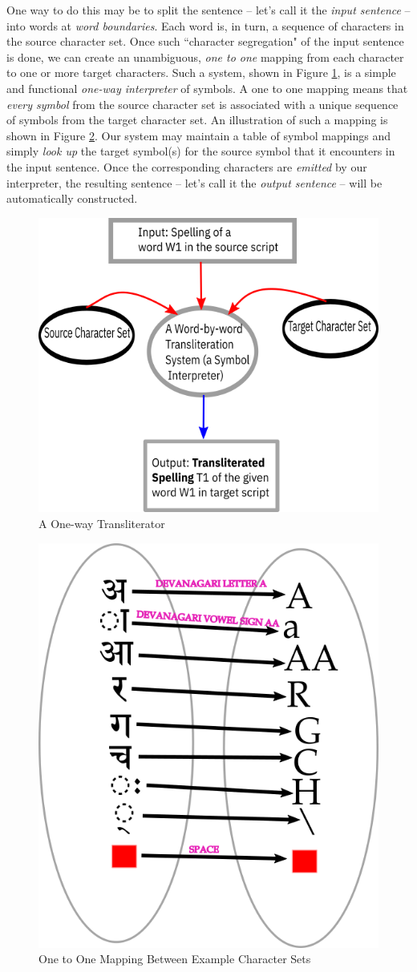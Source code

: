 \documentclass[a4paper, 12pt]{article}
\begin{document}
One way to do this may be to split the sentence -- let's call it the \emph{input sentence} -- into words at \emph{word boundaries}. Each word is, in turn, a sequence of characters in the source character set. Once such ``character segregation" of the input sentence is done, we can create an unambiguous, \emph{one to one} mapping from each character to one or more target characters. Such a system, shown in Figure \ref{fig: transliterator}, is a simple and functional \emph{one-way interpreter} of symbols. A one to one mapping means that \emph{every symbol} from the source character set is associated with a unique sequence of symbols from the target character set. An illustration of such a mapping is shown in Figure \ref{fig: injective-mapping-chars}. Our system may maintain a table of symbol mappings and simply \emph{look up} the target symbol(s) for the source symbol that it encounters in the input sentence. Once the corresponding characters are \emph{emitted} by our interpreter, the resulting sentence -- let's call it the \emph{output sentence} -- will be automatically constructed. 


\begin{figure}[htbp!]
    \centering
    \includegraphics[width=0.5\linewidth]{transliterator.png}
    \caption{A One-way Transliterator}
    \label{fig: transliterator}
\end{figure}


\begin{figure}[htbp!]
    \centering
    \includegraphics[width=0.3\linewidth]{injective-mapping-chars.png}
    \caption{One to One Mapping Between Example Character Sets}
    \label{fig: injective-mapping-chars}
\end{figure}
\end{document}
